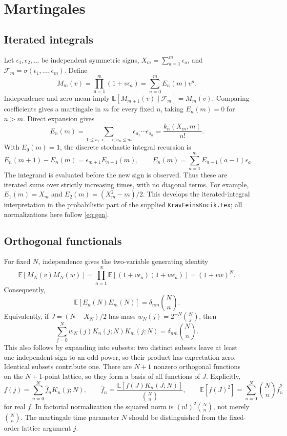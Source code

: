 \chapter{Martingales}
\label{ch:5}
\section{Iterated integrals}
\label{sec:5-1}
Let $\epsilon_1,\epsilon_2,\ldots$ be independent symmetric signs, $X_m=\sum_{a=1}^m\epsilon_a$, and $\mathcal F_m=\sigma(\epsilon_1,\ldots,\epsilon_m)$. Define
\[
M_m(v)=\prod_{a=1}^m(1+v\epsilon_a)=\sum_{n=0}^m E_n(m)v^n.
\]
Independence and zero mean imply $\mathbb E[M_{m+1}(v)\mid\mathcal F_m]=M_m(v)$. Comparing coefficients gives a martingale in $m$ for every fixed $n$, taking $E_n(m)=0$ for $n>m$. Direct expansion gives
\begin{equation}\label{eq:iterated-sign-sums}
E_n(m)=\sum_{1\le a_1<\cdots<a_n\le m}\epsilon_{a_1}\cdots\epsilon_{a_n}
=\frac{k_n(X_m,m)}{n!}.
\end{equation}
With $E_0(m)=1$, the discrete stochastic integral recursion is
\begin{equation}\label{eq:discrete-iterated-recursion}
E_n(m+1)-E_n(m)=\epsilon_{m+1}E_{n-1}(m),\qquad
E_n(m)=\sum_{a=1}^m E_{n-1}(a-1)\epsilon_a.
\end{equation}
The integrand is evaluated before the new sign is observed. Thus these are iterated sums over strictly increasing times, with no diagonal terms. For example, $E_1(m)=X_m$ and $E_2(m)=(X_m^2-m)/2$.
This develops the iterated-integral interpretation in the probabilistic part of the supplied \texttt{KravFeinsKocik.tex}; all normalizations here follow \eqref{eq:gen}.

\section{Orthogonal functionals}
\label{sec:5-2}
For fixed $N$, independence gives the two-variable generating identity
\[
\mathbb E[M_N(v)M_N(w)]=\prod_{a=1}^N\mathbb E[(1+v\epsilon_a)(1+w\epsilon_a)]=(1+vw)^N.
\]
Consequently,
\begin{equation}\label{eq:martingale-orthogonality}
\mathbb E[E_n(N)E_m(N)]=\delta_{nm}\binom Nn.
\end{equation}
Equivalently, if $J=(N-X_N)/2$ has mass $w_N(j)=2^{-N}\binom Nj$, then
\[
\sum_{j=0}^Nw_N(j)K_n(j;N)K_m(j;N)=\delta_{nm}\binom Nn.
\]
This also follows by expanding into subsets: two distinct subsets leave at least one independent sign to an odd power, so their product has expectation zero. Identical subsets contribute one.
There are $N+1$ nonzero orthogonal functions on the $N+1$-point lattice, so they form a basis of all functions of $J$. Explicitly,
\[
f(j)=\sum_{n=0}^N\widehat f_nK_n(j;N),\qquad
\widehat f_n=\frac{\mathbb E[f(J)K_n(J;N)]}{\binom Nn},\qquad
\mathbb E[f(J)^2]=\sum_{n=0}^N\binom Nn\widehat f_n^2
\]
for real $f$. In factorial normalization the squared norm is $(n!)^2\binom Nn$, not merely $\binom Nn$. The martingale time parameter $N$ should be distinguished from the fixed-order lattice argument $j$.

